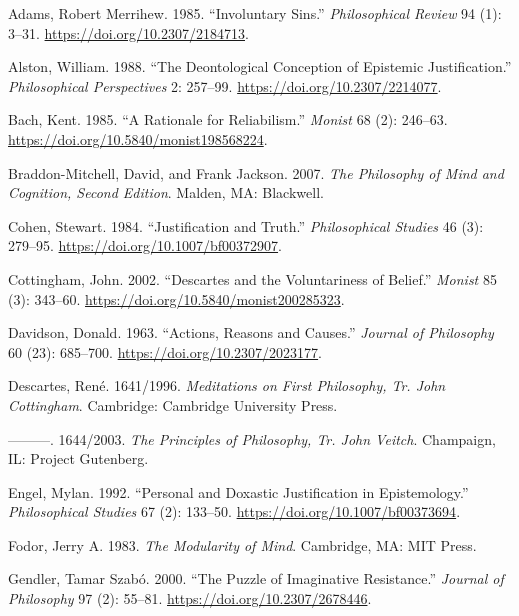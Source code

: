 \documentclass[
  11pt,
  letterpaper,
  DIV=11,
  numbers=noendperiod,
  oneside]{scrartcl}
\newlength{\cslhangindent}
\newenvironment{CSLReferences}[2] %
 {\begin{list}{}{%
  \setlength{\itemindent}{0pt}
  \setlength{\leftmargin}{0pt}
  \setlength{\parsep}{0pt}
  \ifodd #1
   \setlength{\leftmargin}{\cslhangindent}
   \setlength{\itemindent}{-1\cslhangindent}
  \fi
  \setlength{\itemsep}{#2\baselineskip}}}
 {\end{list}}
\begin{document}
\label{refs}
\begin{CSLReferences}{1}{0}
Adams, Robert Merrihew. 1985. {``Involuntary Sins.''}
\emph{Philosophical Review} 94 (1): 3--31.
\url{https://doi.org/10.2307/2184713}.

Alston, William. 1988. {``The Deontological Conception of Epistemic
Justification.''} \emph{Philosophical Perspectives} 2: 257--99.
\url{https://doi.org/10.2307/2214077}.

Bach, Kent. 1985. {``A Rationale for Reliabilism.''} \emph{Monist} 68
(2): 246--63. \url{https://doi.org/10.5840/monist198568224}.

Braddon-Mitchell, David, and Frank Jackson. 2007. \emph{The Philosophy
of Mind and Cognition, {Second Edition}}. Malden, MA: Blackwell.

Cohen, Stewart. 1984. {``Justification and Truth.''} \emph{Philosophical
Studies} 46 (3): 279--95. \url{https://doi.org/10.1007/bf00372907}.

Cottingham, John. 2002. {``Descartes and the Voluntariness of Belief.''}
\emph{Monist} 85 (3): 343--60.
\url{https://doi.org/10.5840/monist200285323}.

Davidson, Donald. 1963. {``Actions, Reasons and Causes.''} \emph{Journal
of Philosophy} 60 (23): 685--700. \url{https://doi.org/10.2307/2023177}.

Descartes, René. 1641/1996. \emph{Meditations on First Philosophy, {Tr.
John Cottingham}}. Cambridge: Cambridge University Press.

---------. 1644/2003. \emph{The Principles of Philosophy, {Tr. John
Veitch}}. Champaign, IL: Project Gutenberg.

Engel, Mylan. 1992. {``Personal and Doxastic Justification in
Epistemology.''} \emph{Philosophical Studies} 67 (2): 133--50.
\url{https://doi.org/10.1007/bf00373694}.

Fodor, Jerry A. 1983. \emph{The Modularity of Mind}. Cambridge, MA: MIT
Press.

Gendler, Tamar Szabó. 2000. {``The Puzzle of Imaginative Resistance.''}
\emph{Journal of Philosophy} 97 (2): 55--81.
\url{https://doi.org/10.2307/2678446}.


\end{CSLReferences}
\end{document}
